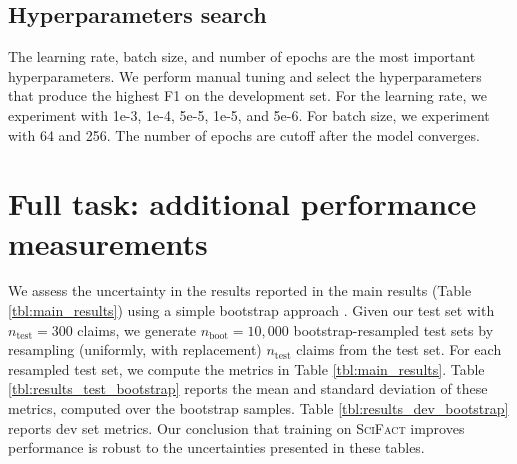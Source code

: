 \documentclass[11pt,a4paper]{article}
\newcommand{\ours}{\textsc{SciFact}\xspace}
\begin{document}
\subsection{Hyperparameters search}

The learning rate, batch size, and number of epochs are the most important hyperparameters. We perform manual tuning and select the hyperparameters that produce the highest F1 on the development set. For the learning rate, we experiment with 1e-3, 1e-4, 5e-5, 1e-5, and 5e-6. For batch size, we experiment with 64 and 256. The number of epochs are cutoff after the model converges.



\section{Full task: additional performance measurements} \label{sec:uncertainty}

We assess the uncertainty in the results reported in the main results (Table \ref{tbl:main_results}) using a simple bootstrap approach \cite{Dror2018TheHG, BergKirkpatrick2012AnEI, Efron1993AnIT}. Given our test set with $n_{\textrm{test}} = 300$ claims, we generate $n_{\textrm{boot}} = 10,000$ bootstrap-resampled test sets by resampling (uniformly, with replacement) $n_{\textrm{test}}$ claims from the test set. For each resampled test set, we compute the metrics in Table \ref{tbl:main_results}. Table \ref{tbl:results_test_bootstrap} reports the mean and standard deviation of these metrics, computed over the bootstrap samples. Table \ref{tbl:results_dev_bootstrap} reports dev set metrics. Our conclusion that training on \ours improves performance is robust to the uncertainties presented in these tables.

\clearpage
\end{document}
